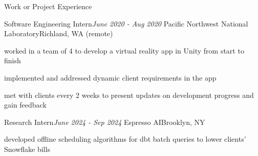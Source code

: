 \documentclass{resume} %
\begin{document}
\begin{rSection}{Work or Project Experience}
\begin{rSubsection}{Software Engineering Intern}{\em June 2020 - Aug 2020 }{Pacific Northwest National Laboratory}{Richland, WA (remote)}
\item worked in a team of 4 to develop a virtual reality app in Unity from start to finish
\item implemented and addressed dynamic client requirements in the app
\item met with clients every 2 weeks to present updates on development progress and gain feedback
\end{rSubsection}

\begin{rSubsection}{Research Intern}{\em June 2024 - Sep 2024 }{Espresso AI}{Brooklyn, NY}
\item developed offline scheduling algorithms for dbt batch queries to lower clients' Snowflake bills
\end{rSubsection}

\end{rSection}

%
%
%
%
\end{document}
